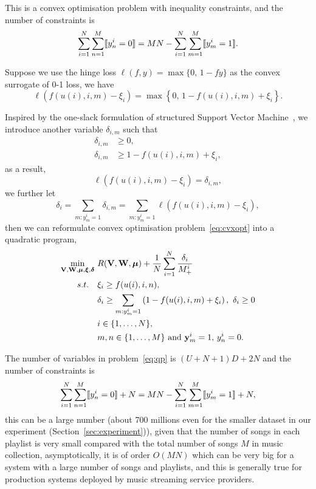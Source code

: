 This is a convex optimisation problem with inequality constraints, 
and the number of constraints is 
$$
\sum_{i=1}^N \sum_{n=1}^M \llbracket y_n^i = 0 \rrbracket = MN - \sum_{i=1}^N \sum_{m=1}^M \llbracket y_m^i = 1 \rrbracket.
$$

Suppose we use the hinge loss $\ell(f, y) = \max \{ 0, \, 1 - fy \}$ as the convex surrogate of 0-1 loss, we have
\begin{equation*}
\ell \left( f(u(i), i, m) - \xi_i \right) = \max \left\{ 0, \, 1 - f( u(i), i, m) + \xi_i \right\}.
\end{equation*}

Inspired by the one-slack formulation of structured Support Vector Machine~\cite{joachims2009cutting}, 
we introduce another variable $\delta_{i,m}$ such that
\begin{equation*}
\begin{aligned}
\delta_{i,m} & \ge 0, \\
\delta_{i,m} & \ge 1 - f( u(i), i, m) + \xi_i, 
\end{aligned}
\end{equation*}
as a result,
\begin{equation*}
\ell \left( f(u(i), i, m) - \xi_i \right) = \delta_{i,m},
\end{equation*}
we further let
\begin{equation*}
\delta_i = \sum_{m: y_m^i = 1} \delta_{i,m} = \sum_{m: y_m^i = 1} \ell \left( f(u(i), i, m) - \xi_i \right),
\end{equation*}
then we can reformulate convex optimisation problem~\ref{eq:cvxopt} into a quadratic program,
\begin{equation}
\label{eq:qp}
\begin{aligned}
\min_{\mathbf{V}, \mathbf{W}, \bm{\mu}, \bm{\xi}, {\bm{\delta}}} \ & R(\mathbf{V}, \mathbf{W}, \bm{\mu}) + \frac{1}{N} \sum_{i=1}^N \frac{\delta_i}{M_+^i} \\
s.t. \quad 
& \xi_i \ge f(u(i), i, n), \\
& \delta_i \ge \sum_{m: y_m^i = 1} \left( 1 - f( u(i), i, m) + \xi_i \right), \ \delta_i \ge 0 \\
& i \in \{1,\dots,N\}, \\
& m, n \in \{1,\dots,M\} \ \mathrm{and} \ \mathbf{y}_m^i = 1, \,  y_n^i = 0. 
\end{aligned}
\end{equation}

The number of variables in problem~\ref{eq:qp} is $(U + N + 1) D + 2N$ and the number of constraints is
$$
\sum_{i=1}^N \sum_{n=1}^M \llbracket y_n^i = 0 \rrbracket + N = MN - \sum_{i=1}^N \sum_{m=1}^M \llbracket y_m^i = 1 \rrbracket + N,
$$
%
this can be a large number (\eg about 700 millions even for the smaller dataset in our experiment (Section~\ref{sec:experiment})),
given that the number of songs in each playlist is very small compared with the total number of songs $M$ in music collection,
asymptotically, it is of order $O(MN)$ which can be very big for a system with a large number of songs and playlists,
and this is generally true for production systems deployed by music streaming service providers.


